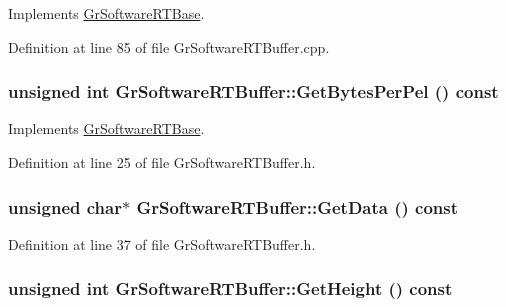 Implements \hyperlink{class_gr_software_r_t_base_152b9d2964518f0c50ff8ced3f3da097}{GrSoftwareRTBase}.

Definition at line 85 of file GrSoftwareRTBuffer.cpp.\hypertarget{class_gr_software_r_t_buffer_7dd0b05522440e0b8112e974095ce0aa}{
\subsubsection[{GetBytesPerPel}]{\setlength{\rightskip}{0pt plus 5cm}unsigned int GrSoftwareRTBuffer::GetBytesPerPel () const}}
\label{class_gr_software_r_t_buffer_7dd0b05522440e0b8112e974095ce0aa}




Implements \hyperlink{class_gr_software_r_t_base_24d6fc1742e612d9fa304e2264bd9dd8}{GrSoftwareRTBase}.

Definition at line 25 of file GrSoftwareRTBuffer.h.\hypertarget{class_gr_software_r_t_buffer_04b103e0d51724ddf7320337a18e83f5}{
\subsubsection[{GetData}]{\setlength{\rightskip}{0pt plus 5cm}unsigned char$\ast$ GrSoftwareRTBuffer::GetData () const}}
\label{class_gr_software_r_t_buffer_04b103e0d51724ddf7320337a18e83f5}




Definition at line 37 of file GrSoftwareRTBuffer.h.\hypertarget{class_gr_software_r_t_buffer_72eb1f3acc53e88f3f89d79226c4e1f2}{
\subsubsection[{GetHeight}]{\setlength{\rightskip}{0pt plus 5cm}unsigned int GrSoftwareRTBuffer::GetHeight () const}}
\label{class_gr_software_r_t_buffer_72eb1f3acc53e88f3f89d79226c4e1f2}




